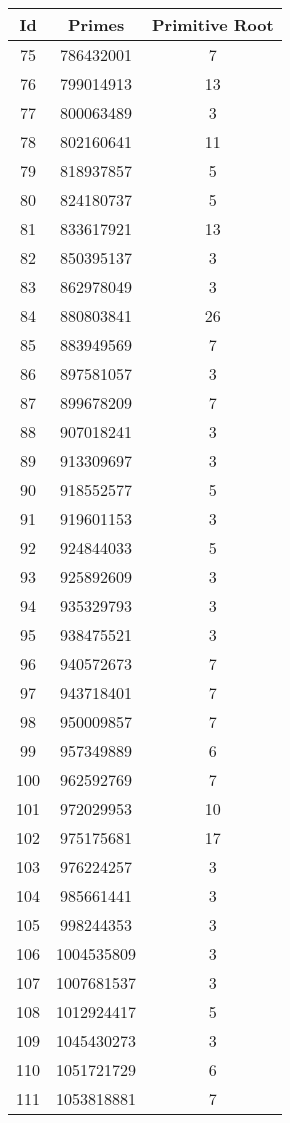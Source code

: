 \begin{spacing}{0.97}
\begin{tabular}{ccc}
\toprule
       Id & Primes & Primitive Root\\
 \midrule
 75 & 786432001 & 7\\
 76 & 799014913 & 13\\
 77 & 800063489 & 3\\
 78 & 802160641 & 11\\
 79 & 818937857 & 5\\
 80 & 824180737 & 5\\
 81 & 833617921 & 13\\
 82 & 850395137 & 3\\
 83 & 862978049 & 3\\
 84 & 880803841 & 26\\
 85 & 883949569 & 7\\
 86 & 897581057 & 3\\
 87 & 899678209 & 7\\
 88 & 907018241 & 3\\
 89 & 913309697 & 3\\
 90 & 918552577 & 5\\
 91 & 919601153 & 3\\
 92 & 924844033 & 5\\
 93 & 925892609 & 3\\
 94 & 935329793 & 3\\
 95 & 938475521 & 3\\
 96 & 940572673 & 7\\
 97 & 943718401 & 7\\
 98 & 950009857 & 7\\
 99 & 957349889 & 6\\
 100 & 962592769 & 7\\
 101 & 972029953 & 10\\
 102 & 975175681 & 17\\
 103 & 976224257 & 3\\
 104 & 985661441 & 3\\
 105 & 998244353 & 3\\
 106 & 1004535809 & 3\\
 107 & 1007681537 & 3\\
 108 & 1012924417 & 5\\
 109 & 1045430273 & 3\\
 110 & 1051721729 & 6\\
 111 & 1053818881 & 7\\
\bottomrule
\end{tabular}
\end{spacing}
